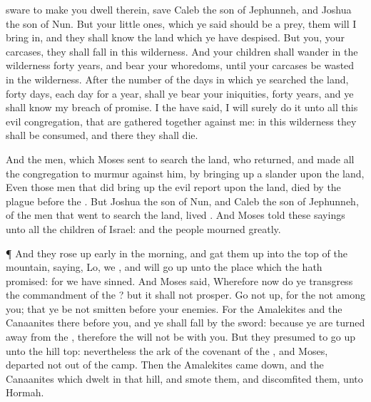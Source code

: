 {sware to make you
dwell therein, save
Caleb the
son of
Jephunneh, and
Joshua the
son of
Nun.
But your little
ones, which ye
said should be a
prey, them will I bring
in, and they shall
know the
land which ye have
despised.
But
{} you, your
carcases, they shall
fall in this
wilderness.
And your
children shall
wander in the
wilderness
forty
years, and
bear your
whoredoms, until your
carcases be
wasted in the
wilderness.
After the
number of the
days in which ye
searched the
land,
{}
forty
days, each
day for a
year, shall ye
bear your
iniquities,
{}
forty
years, and ye shall
know my breach of
promise.
I the
{} have
said, I will
surely
do
it unto all this
evil
congregation, that are gathered
together against me: in this
wilderness they shall be
consumed, and there they shall
die.
\par }{\PP {}And the
men, which
Moses
sent to
search the
land, who
returned, and made all the
congregation to
murmur against him, by bringing
up a
slander upon the
land,
Even
those
men that did bring
up the
evil
report upon the
land,
died by the
plague
before the
{}.
But
Joshua the
son of
Nun, and
Caleb the
son of
Jephunneh,
{} of the
men that
went to
search the
land,
lived
{}.
And
Moses
told these
sayings unto all the
children of
Israel: and the
people
mourned
greatly.
\par }{\PP {}¶ And they rose up
early in the
morning, and gat them
up into the
top of the
mountain,
saying,
Lo, we
{}, and will go
up unto the
place which the
{} hath
promised: for we have
sinned.
And
Moses
said, Wherefore now do ye
transgress the
commandment of the
{}? but it shall not
prosper.
Go not
up, for the
{}
{} not
among you; that ye be not
smitten
before your
enemies.
For the
Amalekites and the
Canaanites
{} there
before you, and ye shall
fall by the
sword: because ye are
turned
away from the
{}, therefore the
{} will not be with you.
But they
presumed to go
up unto the
hill
top: nevertheless the
ark of the
covenant of the
{}, and
Moses,
departed not
out of the
camp.
Then the
Amalekites came
down, and the
Canaanites which
dwelt in that
hill, and
smote them, and
discomfited them,
{} unto
Hormah.

}

